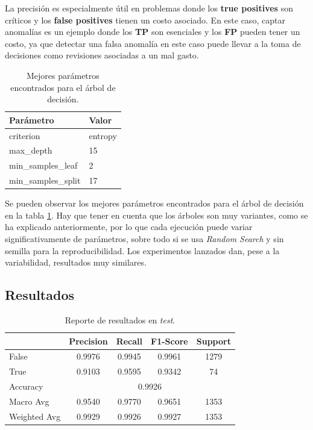 \documentclass[12pt,letterpaper]{article}
\begin{document}
La precisión es especialmente útil en problemas donde los \textbf{true positives} son críticos y los \textbf{false positives} tienen un costo asociado. En este caso, captar anomalías es un ejemplo donde los \textbf{TP} son esenciales y los \textbf{FP} pueden tener un costo, ya que detectar una falsa anomalía en este caso puede llevar a la toma de decisiones como revisiones asociadas a un mal gasto.

\begin{table}[htp]
    \centering
    \begin{tabular}{ll}
        \hline
        \textbf{Parámetro} & \textbf{Valor} \\ \hline
        criterion & entropy \\ 
        max\_depth & 15 \\ 
        min\_samples\_leaf & 2 \\ 
        min\_samples\_split & 17 \\ \hline
    \end{tabular}
    \caption{Mejores parámetros encontrados para el árbol de decisión.}
    \label{tab:hyper_param_decision_tree}
\end{table}

Se pueden observar los mejores parámetros encontrados para el árbol de decisión en la tabla \ref{tab:hyper_param_decision_tree}. Hay que tener en cuenta que los árboles son muy variantes, como se ha explicado anteriormente, por lo que cada ejecución puede variar significativamente de parámetros, sobre todo si se usa \textit{Random Search} y sin semilla para la reproducibilidad. Los experimentos lanzados dan, pese a la variabilidad, resultados muy similares.

\subsection{Resultados}

\begin{table}[htp]
    \centering
    \begin{tabular}{lcccc}
        \hline
        & \textbf{Precision} & \textbf{Recall} & \textbf{F1-Score} & \textbf{Support} \\ \hline
        False & 0.9976 & 0.9945 & 0.9961 & 1279 \\
        True & 0.9103 & 0.9595 & 0.9342 & 74 \\ \hline
        Accuracy & \multicolumn{4}{c}{0.9926} \\
        Macro Avg & 0.9540 & 0.9770 & 0.9651 & 1353 \\
        Weighted Avg & 0.9929 & 0.9926 & 0.9927 & 1353 \\ \hline
    \end{tabular}
    \caption{Reporte de resultados en \textit{test}.}
    \label{tab:results_decision_tree_test}
\end{table}
\end{document}
